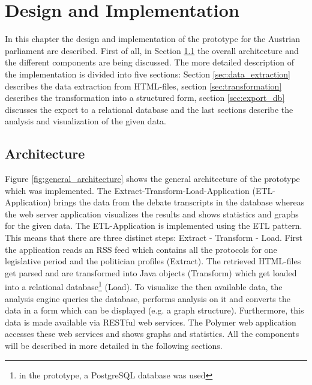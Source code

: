 

\chapter{Design and Implementation}
\label{chap:implementation}

In this chapter the design and implementation of the prototype for the Austrian parliament are described. First of all, in Section \ref{sec:architecture} the overall architecture and the different components are being discussed. The more detailed description of the implementation is divided into five sections: Section \ref{sec:data_extraction} describes the data extraction from HTML-files, section \ref{sec:transformation} describes the transformation into a structured form, section \ref{sec:export_db} discusses the export to a relational database and the last sections describe the analysis and visualization of the given data.


\section{Architecture}
\label{sec:architecture}
Figure \ref{fig:general_architecture} shows the general architecture of the prototype which was implemented. The Extract-Transform-Load-Application (ETL-Application) brings the data from the debate transcripts in the database whereas the web server application visualizes the results and shows statistics and graphs for the given data. The ETL-Application is implemented using the ETL pattern. This means that there are three distinct steps: Extract - Transform - Load. First the application reads an RSS feed which contains all the protocols for one legislative period and the politician profiles (Extract). The retrieved HTML-files get parsed and are transformed into Java objects (Transform) which get loaded into a relational database\footnote{in the prototype, a PostgreSQL database was used} (Load). To visualize the then available data, the analysis engine queries the database, performs analysis on it and converts the data in a form which can be displayed (e.g. a graph structure). Furthermore, this data is made available via RESTful web services. The Polymer web application  accesses these web services and shows graphs and statistics. All the components will be described in more detailed in the following sections.


